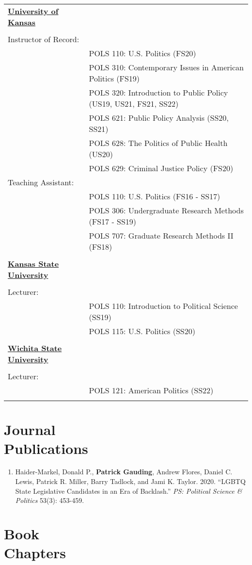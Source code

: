 \documentclass[margin,line,pifont,palatino,courier]{res}
\begin{document}
\begin{resume}
\begin{tabular}{ll}
  \textbf{\underline{University of Kansas}} & \tabularnewline
  & \tabularnewline
    Instructor of Record: & \tabularnewline
  & POLS 110: U.S. Politics (FS20)\tabularnewline
  & POLS 310: Contemporary Issues in American Politics (FS19)\tabularnewline
  & POLS 320: Introduction to Public Policy (US19, US21, FS21, SS22)\tabularnewline
  & POLS 621: Public Policy Analysis (SS20, SS21)\tabularnewline
  & POLS 628: The Politics of Public Health (US20)\tabularnewline
  & POLS 629: Criminal Justice Policy (FS20)\tabularnewline
    Teaching Assistant: & \tabularnewline
  & POLS 110: U.S. Politics (FS16 - SS17)\tabularnewline
  & POLS 306: Undergraduate Research Methods (FS17 - SS19)\tabularnewline
  & POLS 707: Graduate Research Methods II (FS18)\tabularnewline
  & \tabularnewline
    \textbf{\underline{Kansas State University}} & \tabularnewline
  & \tabularnewline
    Lecturer: & \tabularnewline
  & POLS 110: Introduction to Political Science (SS19)\tabularnewline
  & POLS 115: U.S. Politics (SS20)\tabularnewline
  & \tabularnewline
    \textbf{\underline{Wichita State University}} & \tabularnewline
  & \tabularnewline
    Lecturer: & \tabularnewline
  & POLS 121: American Politics (SS22)\tabularnewline
  & \tabularnewline
\end{tabular}

\section{\sc Journal \\Publications}

\begin{enumerate}
  
\item Haider-Markel, Donald P., \textbf{Patrick Gauding}, Andrew Flores,
Daniel C. Lewis, Patrick R. Miller, Barry Tadlock, and Jami
K. Taylor. 2020. ``LGBTQ State Legislative Candidates in an Era
of Backlash.'' \emph{PS: Political Science \& Politics} 53(3): 453-459.


\end{enumerate}

\section{\sc Book \\Chapters}

\begin{enumerate}


\end{enumerate}
\end{resume}
\end{document}
